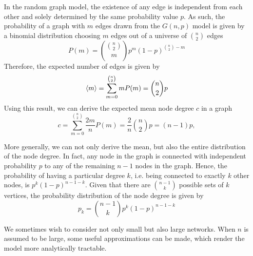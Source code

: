 In the random graph model, the existence of any edge is independent from each other and solely determined by the same probability value $p$.
As such, the probability of a graph with $m$ edges drawn from the $G(n,p)$ model is given by a binomial distribution choosing $m$ edges out of a universe of $\binom{n}{2}$ edges
\begin{equation}
	P(m) = \binom{\binom{n}{2}}{m} p^m (1-p)^{\binom{n}{2}-m}
\end{equation}
Therefore, the expected number of edges is given by
\begin{equation}
	\left< m \right> = \sum^{\binom{n}{2}}_{m=0} m P(m) = \binom{n}{2} p
\end{equation}
Using this result, we can derive the expected mean node degree $c$ in a graph
\begin{equation}
	c = \sum^{\binom{n}{2}}_{m=0} \frac{2m}{n} P(m) = \frac{2}{n} \binom{n}{2} p = (n-1) p,
\end{equation}

More generally, we can not only derive the mean, but also the entire distribution of the node degree.
In fact, any node in the graph is connected with independent probability $p$ to any of the remaining $n-1$ nodes in the graph.
Hence, the probability of having a particular degree $k$, i.e. being connected to exactly $k$ other nodes, is $p^k (1-p)^{n-1-k}$.
Given that there are $\binom{n-1}{k}$ possible sets of $k$ vertices, the probability distribution of the node degree is given by
\begin{equation}
    \label{eq:degree_dist_naive}
	p_k = \binom{n-1}{k} p^k (1-p)^{n-1-k}
\end{equation}


We sometimes wish to consider not only small but also large networks.
When $n$ is assumed to be large, some useful approximations can be made, which render the model more analytically tractable.


